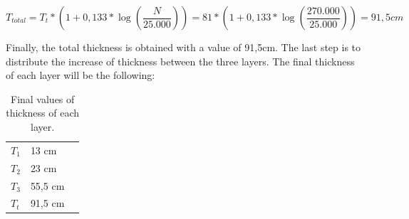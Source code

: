 		\[T_{total} = T_t * (1+0,133*\log(\dfrac{N}{25.000})) = 81 * (1+0,133*\log(\dfrac{270.000}{25.000}))= 91,5cm\]
		
		Finally, the total thickness is obtained with a value of 91,5cm. The last step is to distribute the increase of thickness between the three layers. The final thickness of each layer will be the following:
		
		\begin{table}[htb]
			\centering
			\begin{tabular}{ll p{5cm}}
				\midrule[2pt]
				\(T_1\)& 13 cm\\
				\(T_2\) & 23 cm\\
				\(T_3\)& 55,5 cm \\
				\(T_t\)& 91,5 cm\\
				\bottomrule[2pt]
			\end{tabular}
			\caption{Final values of thickness of each layer.}
			\label{}
		\end{table}
		
		
		
	
	